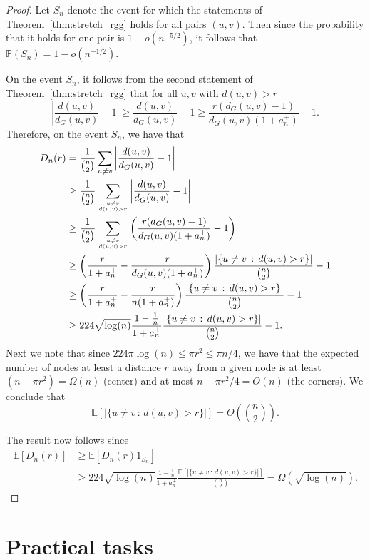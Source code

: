 \documentclass{article}
\begin{document}
\begin{proof}
Let $S_n$ denote the event for which the statements of Theorem~\ref{thm:stretch_rgg} holds for all pairs $(u,v)$. Then since the probability that it holds for one pair is $1 - o(n^{-5/2})$, it follows that $\mathbb{P}(S_n) = 1 - o(n^{-1/2})$.

On the event $S_n$, it follows from the second statement of Theorem~\ref{thm:stretch_rgg} that for all $u,v$ with $d(u,v) > r$
\[
	\left|\frac{d(u,v)}{d_G(u,v)} - 1\right| \ge \frac{d(u,v)}{d_G(u,v)} - 1
	\ge \frac{r(d_G(u,v) - 1)}{d_G(u,v)(1+a_n^+)} - 1.
\]
Therefore, on the event $S_n$, we have that
\begin{align*}
	D_n(r) &= \frac{1}{\binom{n}{2}} \sum_{u \ne v} \left|\frac{d(u,v)}{d_G(u,v)} - 1\right|\\
	&\ge \frac{1}{\binom{n}{2}} \sum_{u \ne v \atop d(u,v) > r} \left|\frac{d(u,v)}{d_G(u,v)} - 1\right|\\
	&\ge \frac{1}{\binom{n}{2}} \sum_{u \ne v \atop d(u,v) > r} \left(\frac{r(d_G(u,v) - 1)}{d_G(u,v)(1+a_n^+)} - 1\right)\\
	&\ge \left(\frac{r}{1 + a_n^+} - \frac{r}{d_G(u,v)(1+a_n^+)}\right) 
		\frac{|\{u \ne v \, :\, d(u,v) > r\}|}{\binom{n}{2}} - 1\\
	&\ge \left(\frac{r}{1 + a_n^+} - \frac{r}{n(1+a_n^+)}\right) 
			\frac{|\{u \ne v \, :\, d(u,v) > r\}|}{\binom{n}{2}} - 1\\
	&\ge 224 \sqrt{\log(n)} \frac{1 - \frac{1}{n}}{1 + a_n^+} \frac{|\{u \ne v \, :\, d(u,v) > r\}|}{\binom{n}{2}} - 1.
\end{align*}
Next we note that since $224 \pi \log(n) \le \pi r^2 \le \pi n/4$, we have that the expected number of nodes at least a distance $r$ away from a given node is at least $(n - \pi r^2) = \Omega(n)$ (center) and at most $n - \pi r^2/4 = O(n)$ (the corners). We conclude that
\[
	\mathbb{E}[|\{u \ne v \, :\, d(u,v) > r\}|] = \Theta\left(\binom{n}{2}\right).
\]

The result now follows since
\begin{align*}
	\mathbb{E}[D_n(r)] &\ge \mathbb{E}[D_n(r) 1_{S_n}] \\
	&\ge 224 \sqrt{\log(n)} \frac{1 - \frac{1}{n}}{1 + a_n^+} 
		\frac{\mathbb{E}[|\{u \ne v \, :\, d(u,v) > r\}|]}{\binom{n}{2}}
		= \Omega(\sqrt{\log(n)}).
\end{align*}
\end{proof}



\section{Practical tasks}
\end{document}
